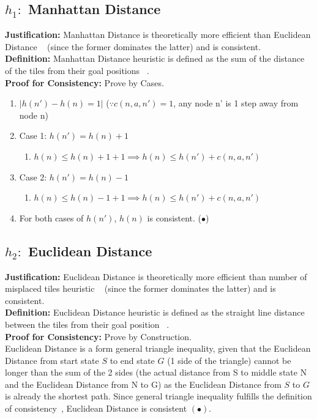 \documentclass[runningheads]{llncs}
\begin{document}
\subsection{\(h_1:\) Manhattan Distance} 
\textbf{Justification:} Manhattan Distance is theoretically more efficient than Euclidean Distance ~\cite[p104]{stuart_russell_artifical_2010} (since the former dominates the latter) and is consistent. \\
\textbf{Definition:} Manhattan Distance heuristic is defined as the sum of the distance of the tiles from their goal positions ~\cite[p103]{stuart_russell_artifical_2010}. \\
\textbf{Proof for Consistency:} Prove by Cases.
\begin{enumerate}
    \item \( |h(n') - h(n) = 1| \) (\( \because c(n, a, n') = 1 \), any node n' is 1 step away from node n)
    \item Case 1: \( h(n') = h(n) + 1 \)
    \begin{enumerate}
        \item \( h(n) \leq h(n) + 1 + 1 \implies h(n) \leq h(n') + c(n, a, n') \)
    \end{enumerate}
    \item Case 2: \( h(n') = h(n) - 1 \)
    \begin{enumerate}
        \item \( h(n) \leq h(n) - 1 + 1 \implies h(n) \leq h(n') + c(n, a, n') \)
    \end{enumerate}
    \item For both cases of \( h(n') \), \( h(n) \) is consistent. (\(\bullet\))
\end{enumerate}

\subsection{\(h_2:\) Euclidean Distance}
\textbf{Justification:} Euclidean Distance is theoretically more efficient than number of misplaced tiles heuristic ~\cite[p104]{stuart_russell_artifical_2010} (since the former dominates the latter) and is consistent. \\
\textbf{Definition:} Euclidean Distance heuristic is defined as the straight line distance between the tiles from their goal position ~\cite{rosalind_euclidean_nodate}. \\
\textbf{Proof for Consistency:} Prove by Construction. \\
Euclidean Distance is a form general triangle inequality, given that the Euclidean Distance from start state \( S \) to end state \( G \) (1 side of the triangle) cannot be longer than the sum of the 2 sides (the actual distance from S to middle state N and the Euclidean Distance from N to G) as the Euclidean Distance from \( S \) to \( G \) is already the shortest path. 
Since general triangle inequality fulfills the definition of consistency~\cite[p95]{stuart_russell_artifical_2010}, Euclidean Distance is consistent \( (\bullet) \).
\end{document}
